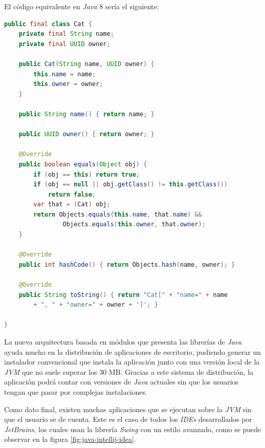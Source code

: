 El código equivalente en \textit{Java} 8 sería el siguiente:

\begin{lstlisting}[language=Java,style=java,frame=single,label={lst:java-comparacion-8}]
public final class Cat {
    private final String name;
    private final UUID owner;

    public Cat(String name, UUID owner) {
        this.name = name;
        this.owner = owner;
    }

    public String name() { return name; }

    public UUID owner() { return owner; }

    @Override
    public boolean equals(Object obj) {
        if (obj == this) return true;
        if (obj == null || obj.getClass() != this.getClass())
            return false;
        var that = (Cat) obj;
        return Objects.equals(this.name, that.name) &&
                Objects.equals(this.owner, that.owner);
    }

    @Override
    public int hashCode() { return Objects.hash(name, owner); }

    @Override
    public String toString() { return "Cat[" + "name=" + name
        + ", " + "owner=" + owner + ']'; }

}
\end{lstlisting}

La nueva arquitectura basada en módulos que presenta las librerías de \textit{Java}
ayuda mucho en la distribución de aplicaciones de escritorio, pudiendo generar un instalador
convencional que instala la aplicación junto con una versión local de la \textit{JVM} que no
suele superar los 30 MB\cite{JPACKAGE}.
Gracias a este sistema de distribución, la aplicación podrá contar con versiones
de \textit{Java} actuales sin que los usuarios tengan que pasar por complejas instalaciones.

Como dato final, existen muchas aplicaciones que se ejecutan sobre la \textit{JVM}
sin que el usuario se de cuenta.
Este es el caso de todos los \textit{IDEs} desarrollados por \textit{JetBrains}, los cuales
usan la librería \textit{Swing} con un estilo avanzado, como se puede observar en la figura
\ref{fig:java-intellij-idea}.

